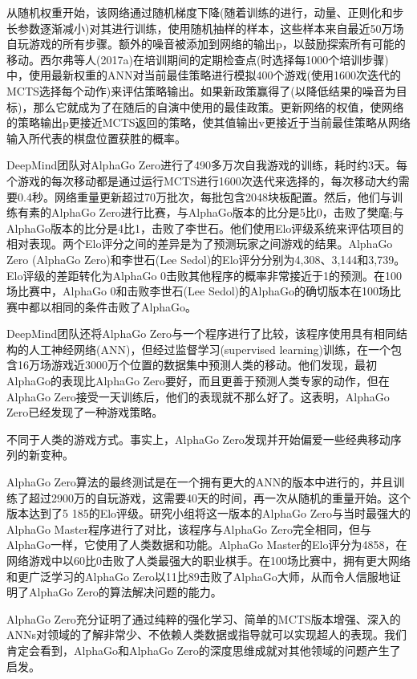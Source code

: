 从随机权重开始，该网络通过随机梯度下降(随着训练的进行，动量、正则化和步长参数逐渐减小)对其进行训练，使用随机抽样的样本，这些样本来自最近50万场自玩游戏的所有步骤。额外的噪音被添加到网络的输出p，以鼓励探索所有可能的移动。西尔弗等人(2017a)在培训期间的定期检查点(时选择每1000个培训步骤)中，使用最新权重的ANN对当前最佳策略进行模拟400个游戏(使用1600次迭代的MCTS选择每个动作)来评估策略输出。如果新政策赢得了(以降低结果的噪音为目标)，那么它就成为了在随后的自演中使用的最佳政策。更新网络的权值，使网络的策略输出p更接近MCTS返回的策略，使其值输出v更接近于当前最佳策略从网络输入所代表的棋盘位置获胜的概率。

DeepMind团队对AlphaGo Zero进行了490多万次自我游戏的训练，耗时约3天。每个游戏的每次移动都是通过运行MCTS进行1600次迭代来选择的，每次移动大约需要0.4秒。网络重量更新超过70万批次，每批包含2048块板配置。然后，他们与训练有素的AlphaGo Zero进行比赛，与AlphaGo版本的比分是5比0，击败了樊麾;与AlphaGo版本的比分是4比1，击败了李世石。他们使用Elo评级系统来评估项目的相对表现。两个Elo评分之间的差异是为了预测玩家之间游戏的结果。AlphaGo Zero (AlphaGo Zero)和李世石(Lee Sedol)的Elo评分分别为4,308、3,144和3,739。Elo评级的差距转化为AlphaGo 0击败其他程序的概率非常接近于1的预测。在100场比赛中，AlphaGo 0和击败李世石(Lee Sedol)的AlphaGo的确切版本在100场比赛中都以相同的条件击败了AlphaGo。

DeepMind团队还将AlphaGo Zero与一个程序进行了比较，该程序使用具有相同结构的人工神经网络(ANN)，但经过监督学习(supervised learning)训练，在一个包含16万场游戏近3000万个位置的数据集中预测人类的移动。他们发现，最初AlphaGo的表现比AlphaGo Zero要好，而且更善于预测人类专家的动作，但在AlphaGo Zero接受一天训练后，他们的表现就不那么好了。这表明，AlphaGo Zero已经发现了一种游戏策略。

不同于人类的游戏方式。事实上，AlphaGo Zero发现并开始偏爱一些经典移动序列的新变种。

AlphaGo Zero算法的最终测试是在一个拥有更大的ANN的版本中进行的，并且训练了超过2900万的自玩游戏，这需要40天的时间，再一次从随机的重量开始。这个版本达到了5 185的Elo评级。研究小组将这一版本的AlphaGo Zero与当时最强大的AlphaGo Master程序进行了对比，该程序与AlphaGo Zero完全相同，但与AlphaGo一样，它使用了人类数据和功能。AlphaGo Master的Elo评分为4858，在网络游戏中以60比0击败了人类最强大的职业棋手。在100场比赛中，拥有更大网络和更广泛学习的AlphaGo Zero以11比89击败了AlphaGo大师，从而令人信服地证明了AlphaGo Zero的算法解决问题的能力。

AlphaGo Zero充分证明了通过纯粹的强化学习、简单的MCTS版本增强、深入的ANNs对领域的了解非常少、不依赖人类数据或指导就可以实现超人的表现。我们肯定会看到，AlphaGo和AlphaGo Zero的深度思维成就对其他领域的问题产生了启发。

